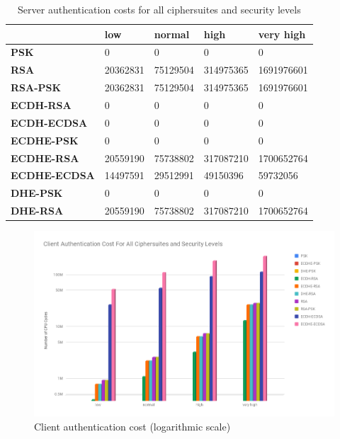 \documentclass{llncs}
\begin{document}
\begin{table}[]
\begin{tabular}{|l|l|l|l|l|}
\hline
                     & \textbf{low} & \textbf{normal} & \textbf{high} & \textbf{very high} \\ \hline
\textbf{PSK}         & 0            & 0               & 0             & 0                  \\ \hline
\textbf{RSA}         & 20362831     & 75129504        & 314975365     & 1691976601         \\ \hline
\textbf{RSA-PSK}     & 20362831     & 75129504        & 314975365     & 1691976601         \\ \hline
\textbf{ECDH-RSA}    & 0            & 0               & 0             & 0                  \\ \hline
\textbf{ECDH-ECDSA}  & 0            & 0               & 0             & 0                  \\ \hline
\textbf{ECDHE-PSK}   & 0            & 0               & 0             & 0                  \\ \hline
\textbf{ECDHE-RSA}   & 20559190     & 75738802        & 317087210     & 1700652764         \\ \hline
\textbf{ECDHE-ECDSA} & 14497591     & 29512991        & 49150396      & 59732056           \\ \hline
\textbf{DHE-PSK}     & 0            & 0               & 0             & 0                  \\ \hline
\textbf{DHE-RSA}     & 20559190     & 75738802        & 317087210     & 1700652764         \\ \hline
\end{tabular}
  \centering \caption{\label{table:tls-auth-cost-server} Server authentication costs for all ciphersuites and security levels}
\end{table}

\begin{figure}
  \centering
  \includegraphics[width=1.0\textwidth]{img/tls-client-auth-cost.png}
  \centering \caption{\label{fig:tls-auth-cost-client} Client authentication cost (logarithmic scale)}
\end{figure}
\end{document}
